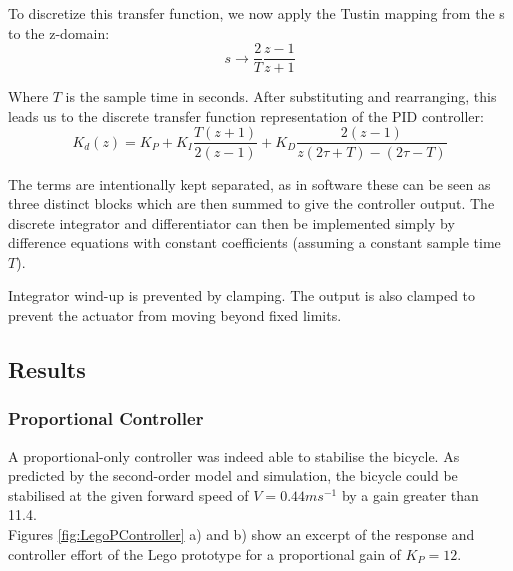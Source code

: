 To discretize this transfer function, we now apply the Tustin mapping from the s to the z-domain:
\begin{equation*}
s \rightarrow \frac{2}{T} \frac{z - 1}{z + 1}
\end{equation*}

Where $T$ is the sample time in seconds. After substituting and rearranging, this leads us to the discrete transfer function representation of the PID controller:
\begin{equation*}
K_d(z) = K_P + K_I \frac{T (z + 1)}{2 (z - 1)} + K_D \frac{2 (z - 1)}{z(2 \tau + T) - (2 \tau - T)}
\end{equation*}

The terms are intentionally kept separated, as in software these can be seen as three distinct blocks which are then summed to give the controller output. The discrete integrator and differentiator can then be implemented simply by difference equations with constant coefficients (assuming a constant sample time $T$).

Integrator wind-up is prevented by clamping. The output is also clamped to prevent the actuator from moving beyond fixed limits.

\subsection{Results}
\subsubsection{Proportional Controller}
A proportional-only controller was indeed able to stabilise the bicycle. As predicted by the second-order model and simulation, the bicycle could be stabilised at the given forward speed of $V=0.44ms^{-1}$ by a gain greater than 11.4. \\
Figures \ref{fig:LegoPController} a) and b) show an excerpt of the response and controller effort of the Lego prototype for a proportional gain of $K_P=12$.

